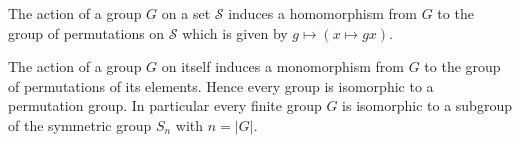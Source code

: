 \begin{theorem}
\label{thm_GroupActionHom}
The action of a group $G$ on a set $\mathcal{S}$ induces a homomorphism from $G$ to the group of permutations on $\mathcal{S}$ which is given by $g \mapsto (x \mapsto gx)$.
\end{theorem}

\begin{corollary}[Cayley]
The action of a group $G$ on itself induces a monomorphism from $G$ to the group of permutations of its elements. Hence every group is isomorphic to a permutation group. In particular every finite group $G$ is isomorphic to a subgroup of the symmetric group $S_n$ with $n = |G|$.
\end{corollary}
